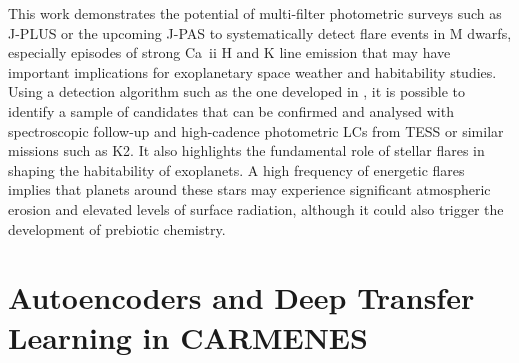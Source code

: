 This work demonstrates the potential of multi-filter photometric surveys such as J-PLUS or the upcoming J-PAS to systematically detect flare events in M dwarfs, especially episodes of strong Ca~{\sc ii} H and K line emission that may have important implications for exoplanetary space weather and habitability studies. Using a detection algorithm such as the one developed in \citet{masbuitrago2022}, it is possible to identify a sample of candidates that can be confirmed and analysed with spectroscopic follow-up and high-cadence photometric LCs from TESS or similar missions such as K2. It also highlights the fundamental role of stellar flares in shaping the habitability of exoplanets. A high frequency of energetic flares implies that planets around these stars may experience significant atmospheric erosion and elevated levels of surface radiation, although it could also trigger the development of prebiotic chemistry.


\chapter{Autoencoders and Deep Transfer Learning in CARMENES}
\label{chp:autoencoders_paper}






